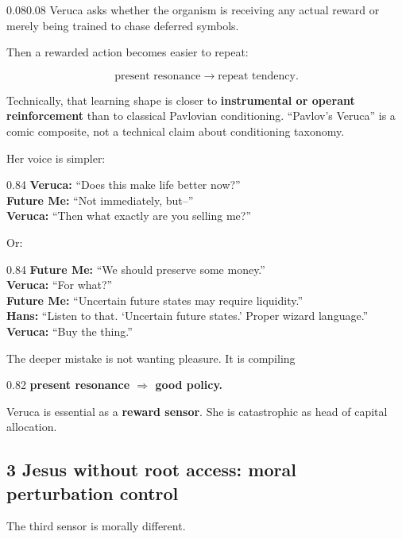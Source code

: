 \documentclass[10pt,letterpaper]{article}
\newenvironment{paperbody}
  {\begin{adjustwidth}{0.08\textwidth}{0.08\textwidth}\justifying}
  {\par\end{adjustwidth}}
\newenvironment{dialoguebox}
  {\Needspace{5\baselineskip}\par\vspace{0.26em}\begin{center}\begingroup
   \begin{lrbox}{\dialogueboxsave}\begin{varwidth}{0.84\linewidth}
   \small\rmfamily\upshape\RaggedRight}
  {\end{varwidth}\end{lrbox}\fbox{\usebox{\dialogueboxsave}}
   \endgroup\end{center}\vspace{0.26em}}
\newenvironment{thesisbox}
  {\Needspace{3.5\baselineskip}\par\vspace{0.32em}\begin{center}\begingroup
   \begin{lrbox}{\thesisboxsave}\begin{varwidth}{0.82\linewidth}
   \normalsize\rmfamily\bfseries\upshape\RaggedRight}
  {\end{varwidth}\end{lrbox}\fbox{\usebox{\thesisboxsave}}
   \endgroup\end{center}\vspace{0.32em}}
\let\oldsubsection\subsection
\renewcommand{\subsection}{\Needspace{5\baselineskip}\oldsubsection}
\begin{document}
\begin{paperbody}
Veruca asks whether the organism is receiving any actual reward or
merely being trained to chase deferred symbols.

Then a rewarded action becomes easier to repeat:

\[
\text{present resonance}
\to
\text{repeat tendency}.
\]

Technically, that learning shape is closer to \textbf{instrumental or
operant reinforcement} than to classical Pavlovian conditioning.
``Pavlov's Veruca'' is a comic composite, not a technical claim about
conditioning taxonomy.

Her voice is simpler:

\begin{dialoguebox}
\textbf{Veruca:} ``Does this make life better now?''\\[0.35em]
\textbf{Future Me:} ``Not immediately, but--''\\[0.35em]
\textbf{Veruca:} ``Then what exactly are you selling me?''
\end{dialoguebox}

Or:

\begin{dialoguebox}
\textbf{Future Me:} ``We should preserve some money.''\\[0.35em]
\textbf{Veruca:} ``For what?''\\[0.35em]
\textbf{Future Me:} ``Uncertain future states may require liquidity.''\\[0.35em]
\textbf{Hans:} ``Listen to that. `Uncertain future states.' Proper
wizard language.''\\[0.35em]
\textbf{Veruca:} ``Buy the thing.''
\end{dialoguebox}

The deeper mistake is not wanting pleasure. It is compiling

\begin{thesisbox}
present resonance \(\Rightarrow\) good policy.
\end{thesisbox}

Veruca is essential as a \textbf{reward sensor}. She is catastrophic as
head of capital allocation.

\subsection{3 Jesus without root access: moral perturbation
control}\label{jesus-without-root-access-moral-perturbation-control}

The third sensor is morally different.


\end{paperbody}
\end{document}
